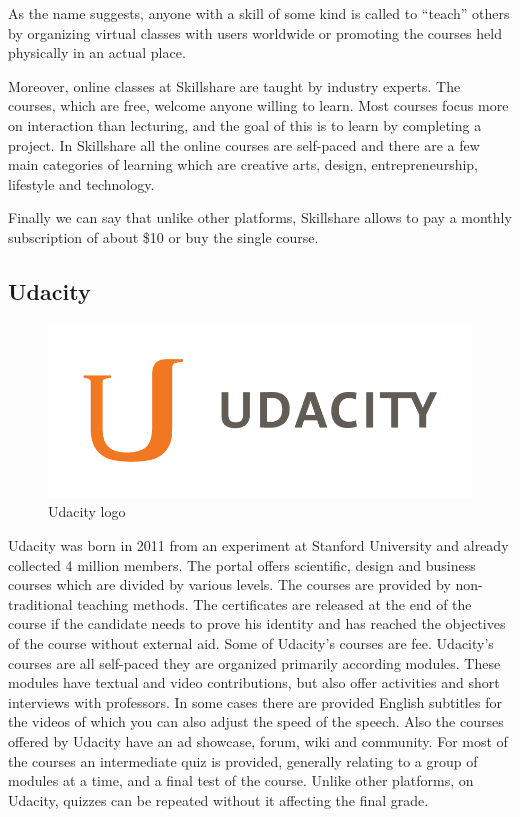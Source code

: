 As the name suggests, anyone with a skill of some kind is called to “teach” others by organizing virtual classes with users worldwide or promoting the courses held physically in an actual place.

Moreover, online classes at Skillshare are taught by industry experts. The courses, which are free, welcome anyone willing to learn. Most courses focus more on interaction than lecturing, and the goal of this is to learn by completing a project.
In Skillshare all the online courses are self-paced and there are a few main categories of learning which are creative arts, design, entrepreneurship, lifestyle and technology.


Finally we can say that unlike other platforms, Skillshare allows to pay a monthly subscription of about \$10 or buy the single course.


\subsection{Udacity}
\label{subsec:udacity}
\begin{figure}[htb] %
 \centering
 \includegraphics[width=0.5\linewidth]{images/chapter1/udacity.png}\hfill
 \caption[Udacity logo]{Udacity logo}
 \label{fig:fourV}
\end{figure}

Udacity was born in 2011 from an experiment at Stanford University and already collected 4 million members. The portal offers scientific, design and business courses which are divided by various levels. The courses are provided by non-traditional teaching methods.
The certificates are released at the end of the course if the candidate needs to prove his identity and has reached the objectives of the course without external aid. Some of Udacity's courses are fee.
Udacity’s courses are all self-paced they are organized primarily according modules. These modules have textual and video contributions, but also offer activities and short interviews with professors. In some cases there are provided English subtitles for the videos of which you can also adjust the speed of the speech.
Also the courses offered by Udacity have an ad showcase, forum, wiki and community. For most of the courses an intermediate quiz is provided, generally relating to a group of modules at a time, and a final test of the course. Unlike other platforms, on Udacity, quizzes can be repeated without it affecting the final grade.


